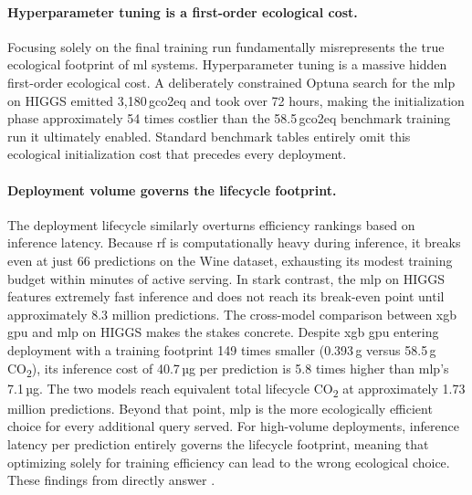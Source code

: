 \paragraph{Hyperparameter tuning is a first-order ecological cost.}
Focusing solely on the final training run fundamentally misrepresents the true ecological footprint of \gls{ml} systems. Hyperparameter tuning is a massive hidden first-order ecological cost. A deliberately constrained Optuna search for the \gls{mlp} on HIGGS emitted 3{,}180\,\gls{gco2eq} and took over 72 hours, making the initialization phase approximately 54 times costlier than the 58.5\,\gls{gco2eq} benchmark training run it ultimately enabled. Standard benchmark tables entirely omit this ecological initialization cost that precedes every deployment.

\paragraph{Deployment volume governs the lifecycle footprint.}
The deployment lifecycle similarly overturns efficiency rankings based on inference latency. Because \gls{rf} is computationally heavy during inference, it breaks even at just 66 predictions on the Wine dataset, exhausting its modest training budget within minutes of active serving. In stark contrast, the \gls{mlp} on HIGGS features extremely fast inference and does not reach its break-even point until approximately 8.3 million predictions. The cross-model comparison between \gls{xgb} \gls{gpu} and \gls{mlp} on HIGGS makes the stakes concrete. Despite \gls{xgb} \gls{gpu} entering deployment with a training footprint 149 times smaller (0.393\,g versus 58.5\,g CO\textsubscript{2}), its inference cost of 40.7\,µg per prediction is 5.8 times higher than \gls{mlp}'s 7.1\,µg. The two models reach equivalent total lifecycle CO\textsubscript{2} at approximately 1.73 million predictions. Beyond that point, \gls{mlp} is the more ecologically efficient choice for every additional query served. For high-volume deployments, inference latency per prediction entirely governs the lifecycle footprint, meaning that optimizing solely for training efficiency can lead to the wrong ecological choice. These findings from  directly answer .

